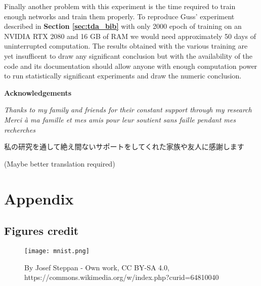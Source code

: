 \documentclass[12pt, a4paper]{article}
\begin{document}
Finally another problem with this experiment is the time required to train enough networks and train them properly. To reproduce Guss' experiment described in \textbf{Section \ref{sec:tda_bib}} with only 2000 epoch of training on an NVIDIA RTX 2080 and 16 GB of RAM we would need approximately 50 days of uninterrupted computation. The results obtained with the various training are yet insufficent to draw any significant conclusion but with the availability of the code and its documentation should allow anyone with enough computation power to run statistically significant experiments and draw the numeric conclusion.\\

\newpage
\thispagestyle{empty}
\mbox{}
\newpage





\newpage
\thispagestyle{empty}
\mbox{}
\newpage

{\LARGE \textbf{Acknowledgements}}

\vspace{20mm}

\textit{Thanks to my family and friends for their constant support through my research}\\

\textit{Merci à ma famille et mes amis pour leur soutient sans faille pendant mes recherches}\\

\begin{CJK}{UTF8}{min} 私の研究を通して絶え間ないサポートをしてくれた家族や友人に感謝します  \end{CJK} (Maybe better translation required)\\

\newpage
\thispagestyle{empty}
\mbox{}
\newpage

\section{Appendix}

\subsection{Figures credit}
\begin{figure}[H]
  \centering
  \texttt{[image: mnist.png]}
  \caption[]{By Josef Steppan - Own work, CC BY-SA 4.0, https://commons.wikimedia.org/w/index.php?curid=64810040}
\end{figure}
\end{document}
